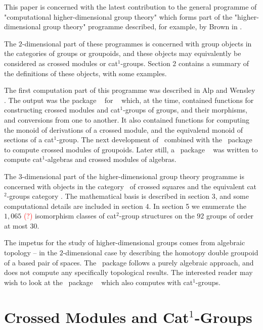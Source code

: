 \documentclass[a4paper,11pt]{article}
\theoremstyle{plain}
\theoremstyle{definition}
\begin{document}
This paper is concerned with the latest contribution to the general programme 
of "computational higher-dimensional group theory" which forms part of the 
"higher-dimensional group theory" programme described, for example, 
by Brown in \cite{brown-lms}. 

The $2$-dimensional part of these programmes is concerned with group objects 
in the categories of groups or groupoids, and these objects may equivalently 
be considered as crossed modules or cat$^1$-groups. 
Section 2 contains a summary of the definitions of these objects, 
with some examples. 

The first computation part of this programme was described in 
Alp and Wensley \cite{alp-wensley-ijac}. 
The output was the package \XMod\ \cite{xmod} for \GAP\ \cite{gap} which, 
at the time, contained functions for constructing crossed modules and cat$^1$-groups of groups, and their morphisms, and conversions from one to another. 
It also contained functions for computing the monoid of derivations of a 
crossed module, and the equivalend monoid of sections of a cat$^1$-group. 
The next development of \XMod\ combined with the \GAP\ package \groupoids\ 
\cite{groupoids} to compute crossed modules of groupoids. 
Later still, a \GAP\ package \XModAlg\ \cite{xmodalg} was written to compute 
cat$^1$-algebras and crossed modules of algebras. 

The $3$-dimensional part of the higher-dimensional group theory programme 
is concerned with objects in the category \catXSq\ of crossed squares 
and the equivalent cat$^2$-groups category \catCatt. 
The mathematical basis is described in section 3, 
and some computational details are included in section 4. 
In section 5 we enumerate the $1,065$ \textcolor{red}{(?)} isomorphism classes 
of cat$^2$-group structures on the $92$ groups of order at most $30$. 

The impetus for the study of higher-dimensional groups 
comes from algebraic topology -- in the $2$-dimensional case 
by describing the homotopy double groupoid of a based pair of spaces. 
The \XMod\ package follows a purely algebraic approach, 
and does not compute any specifically topological results. 
The interested reader may wish to look at the \GAP\ package
\HAP\ \cite{hap} which also computes with cat$^1$-groups. 



\section{Crossed Modules and Cat$^{1}$-Groups}
\end{document}
